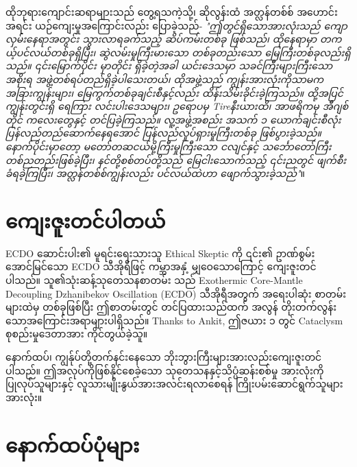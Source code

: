 \documentclass[10pt,twocolumn,letterpaper]{article}
\begin{document}
ထိုဘုရားကျောင်းဆရာများသည် တွေ့ရသကဲ့သို့၊ ဆိုလွန်းထံ အတ္လန်တစ်စ် အဟောင်းအရင်း ယဉ်ကျေးမှုအကြောင်းလည်း ပြောခဲ့သည်- \textit{"ဤတွင်ရှိသောအားလုံးသည် ကျောလှမ်းနေရာအတွင်း သွားလာရခက်သည့် ဆိပ်ကမ်းတစ်ခု ဖြစ်သည်၊ ထိုနေရာမှာ တကယ့်ပင်လယ်တစ်ခုရှိပြီး၊ ဆွဲလမ်းမှုကြီးမားသော တစ်ခုတည်းသော မြေကြီးတစ်ခုလည်းရှိသည်။ ၎င်းမြောက်ပိုင်း မှာတိုင်း ရှိခဲ့တဲ့အခါ ယင်းဒေသမှာ သခင်ကြီးများကြီးသော အစိုးရ အဖွဲ့တစ်ရပ်တည်ရှိခဲ့ပါသေးတယ်၊ ထိုအဖွဲ့သည် ကျွန်းအားလုံးကိုသာမက အခြားကျွန်းများ၊ မြေကွက်တစ်ခုချင်းစီနှင့်လည်း ထိန်းသိမ်းခိုင်းခဲ့ကြသည်။ ထို့အပြင် ကျွန်းတွင်းရှိ ရေကြား လင်းပါးဒေသများ၊ ဥရောပမှ Tireနီးယားထိ၊ အာဖရိကမှ အီဂျစ်တိုင် ကလေးတွေနှင့် တင်ပြခဲ့ကြသည်။ လူ့အဖွဲ့အစည်း အသက် ၁ ယောက်ချင်းစီလုံး ပြန်လည်တည်ဆောက်နေရအောင် ပြန်လည်လှုပ်ရှားမှုကြီးတစ်ခု ဖြစ်ပွားခဲ့သည်။ နောက်ပိုင်းမှာတော့ မတော်တဆငယ်မို့ကြီးမှုကြီးသော ငလျင်နှင့် သင်္ဘောတော်ကြီး တစ်ညတည်းဖြစ်ခဲ့ပြီး၊ နင်တို့စစ်တပ်တို့သည် မြေငါးသောက်သည့် ၎င်းညတွင် ဖျက်စီးခံရခဲ့ကြပြီး၊ အတ္လန်တစ်စ်ကျွန်းလည်း ပင်လယ်ထဲဟာ ဖျောက်သွားခဲ့သည်"}။

\section{ကျေးဇူးတင်ပါတယ်}

ECDO ဆောင်းပါး၏ မူရင်းရေးသားသူ Ethical Skeptic ကို ၎င်း၏ ဥာဏ်စွမ်းအောင်မြင်သော ECDO သီအိုရီဖြင့် ကမ္ဘာအနှံ့ မျှဝေသောကြောင့် ကျေးဇူးတင်ပါသည်။ သူ၏သုံးဆန့်သုတေသနစာတမ်း \cite{1} သည် Exothermic Core-Mantle Decoupling Dzhanibekov Oscillation (ECDO) သီအိုရီအတွက် အရေးပါဆုံး စာတမ်း များထဲမှ တစ်ခုဖြစ်ပြီး ဤစာတမ်းတွင် တင်ပြထားသည်ထက် အလွန် တိုးတက်လွန်းသောအကြောင်းအရာများပါရှိသည်။
Thanks to Ankit, ဤဇယား ၁ တွင် Cataclysm စုစည်းမှုဒေတာအား ကိုင်တွယ်ခဲ့သူ။

နောက်ထပ်၊ ကျွန်ုပ်တို့တက်နင်းနေသော ဘိုးဘွားကြီးများအားလည်းကျေးဇူးတင်ပါသည်။ ဤအလုပ်ကိုဖြစ်နိုင်စေခဲ့သော သုတေသနနှင့်သိပ္ပံဆန်းစစ်မှု အားလုံးကို ပြုလုပ်သူများနှင့် လူသားမျိုးနွယ်အားအလင်းရလာစေရန် ကြိုးပမ်းဆောင်ရွက်သူများအားလုံး။

\clearpage
\twocolumn

\section{နောက်ထပ်ပုံများ}
\end{document}
